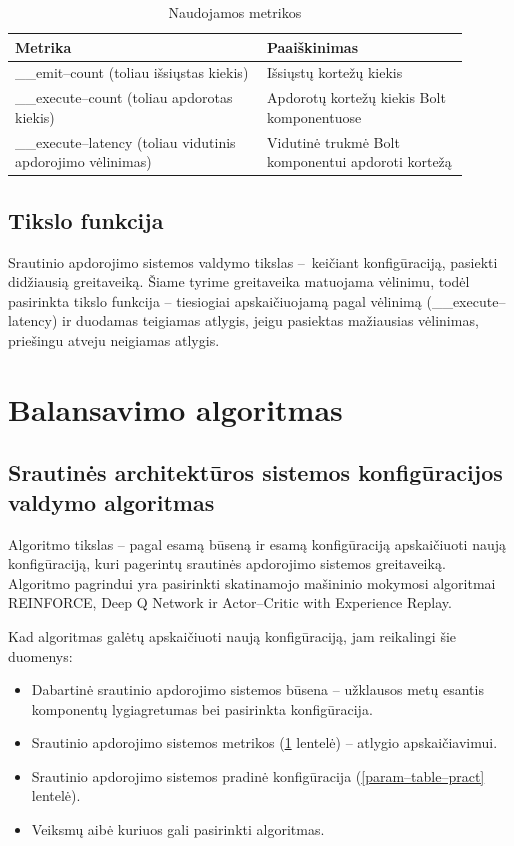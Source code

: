 \documentclass{VUMIFPSbakalaurinis}
\begin{document}
\begin{longtable}{|p{0.5\linewidth}|p{0.4\linewidth}|}
    \caption{Naudojamos metrikos}
    \label{metrics–table}\\
    \hline
    \rowcolor[HTML]{C0C0C0} 
    Metrika                                  & Paaiškinimas            \\ \hline
    \endfirsthead
    \endhead
    \_\_emit–count (toliau išsiųstas kiekis)                           & Išsiųstų kortežų kiekis                    \\ \hline
    \_\_execute–count  (toliau apdorotas kiekis)                       & Apdorotų kortežų kiekis Bolt komponentuose \\ \hline
    \_\_execute–latency  (toliau vidutinis apdorojimo vėlinimas)       & Vidutinė trukmė Bolt komponentui apdoroti kortežą                                          \\ \hline
\end{longtable}

\subsection{Tikslo funkcija}

Srautinio apdorojimo sistemos valdymo tikslas – keičiant konfigūraciją, pasiekti didžiausią greitaveiką. Šiame tyrime greitaveika matuojama vėlinimu, todėl pasirinkta tikslo funkcija – tiesiogiai apskaičiuojamą pagal vėlinimą (\_\_execute–latency) ir duodamas teigiamas atlygis, jeigu pasiektas mažiausias vėlinimas, priešingu atveju neigiamas atlygis. 

\section{Balansavimo algoritmas}

\subsection{Srautinės architektūros sistemos konfigūracijos valdymo algoritmas}

Algoritmo tikslas – pagal esamą būseną ir esamą konfigūraciją apskaičiuoti naują konfigūraciją, kuri pagerintų srautinės apdorojimo sistemos greitaveiką. Algoritmo pagrindui yra pasirinkti skatinamojo mašininio mokymosi algoritmai REINFORCE, Deep Q Network ir Actor–Critic with Experience Replay.

Kad algoritmas galėtų apskaičiuoti naują konfigūraciją, jam reikalingi šie duomenys:
\begin{itemize}
    \item Dabartinė srautinio apdorojimo sistemos būsena – užklausos metų esantis komponentų lygiagretumas bei pasirinkta konfigūracija.
    \item Srautinio apdorojimo sistemos metrikos (\ref{metrics–table} lentelė) – atlygio apskaičiavimui.
    \item Srautinio apdorojimo sistemos pradinė konfigūracija (\ref{param–table–pract} lentelė).
    \item Veiksmų aibė kuriuos gali pasirinkti algoritmas.
\end{itemize}
\end{document}
